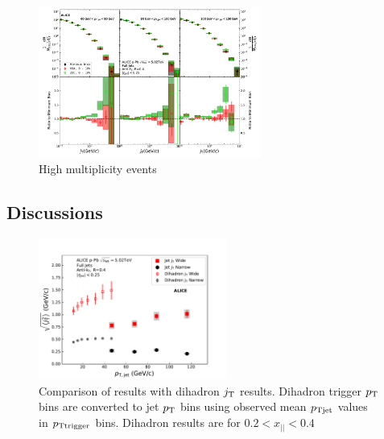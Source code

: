 \begin{figure}[htb]
\begin{center}
\includegraphics[width=0.65\textwidth]{figures/results/HighMJetConeJtSignalPtFrom4To8.pdf}
\caption{High multiplicity events}
\label{fig:jt_highmult}
\end{center}
\end{figure}



\FloatBarrier

\subsection{Discussions}
\begin{figure}[htb]
\centering
\includegraphics[width=0.55\textwidth]{figures/results/RMSWithSystematics_DihadronJetPt}

\caption{Comparison of results with dihadron $j_{\rm T}$ results. Dihadron trigger $p_{\rm T}$ bins are converted to jet $p_{\rm T}$  bins  using observed mean  $p_{\rm Tjet}$ values in $p_{\rm Ttrigger}$ bins. Dihadron results are for $0.2 < x_{||} < 0.4$ }
\label{fig:DihadronComparison}
\end{figure}

